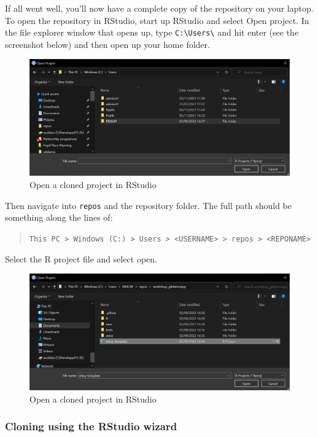 \documentclass[
  12pt,
]{article}
\begin{document}
If all went well, you'll now have a complete copy of the repository on
your laptop. To open the repository in RStudio, start up RStudio and
select Open project. In the file explorer window that opens up, type
\texttt{C:\textbackslash{}Users\textbackslash{}} and hit enter (see the
screenshot below) and then open up your home folder.

\begin{figure}
\includegraphics[width=0.6\linewidth]{images/gitdemo/gitdemo-RStudio_OpenProj} \caption{Open a cloned project in RStudio}\label{fig:unnamed-chunk-5}
\end{figure}

Then navigate into \texttt{repos} and the repository folder. The full
path should be something along the lines of:

\begin{quote}
\texttt{This\ PC\ \textgreater{}\ Windows\ (C:)\ \textgreater{}\ Users\ \textgreater{}\ \textless{}USERNAME\textgreater{}\ \textgreater{}\ repos\ \textgreater{}\ \textless{}REPONAME\textgreater{}}
\end{quote}

Select the R project file and select open.

\begin{figure}
\includegraphics[width=0.6\linewidth]{images/gitdemo/gitdemo-RStudio_OpenProj_fullpath} \caption{Open a cloned project in RStudio}\label{fig:unnamed-chunk-6}
\end{figure}

\hypertarget{cloning-using-the-rstudio-wizard}{%
\subsubsection{Cloning using the RStudio
wizard}\label{cloning-using-the-rstudio-wizard}}
\end{document}
